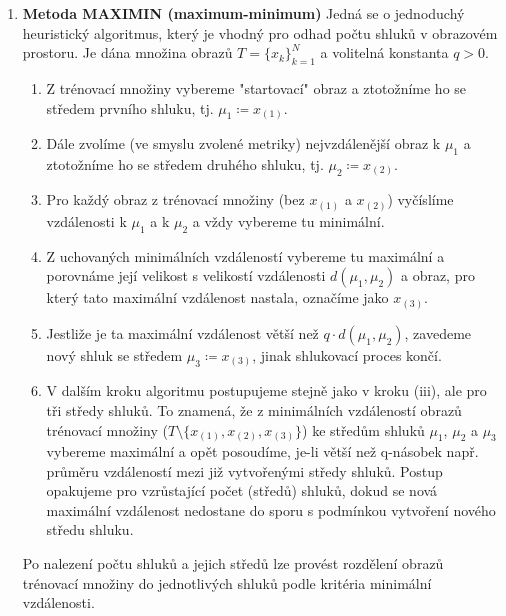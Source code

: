 \begin{enumerate}[label=(\Alph*)]
\begin{enumerate}[label=\arabic*.]
\item \textbf{Metoda MAXIMIN (maximum-minimum)}
Jedná se o jednoduchý heuristický algoritmus, který je vhodný pro odhad počtu shluků v obrazovém prostoru. Je dána množina obrazů $ T = \{x_k\}_{k=1}^N $ a volitelná konstanta $ q > 0 $.
\begin{enumerate}[label=(\roman*)]
\item Z trénovací množiny vybereme "startovací" obraz a ztotožníme ho se středem prvního shluku, tj. $ \mu_1 \coloneqq x_{(1)} $.
\item Dále zvolíme (ve smyslu zvolené metriky) nejvzdálenější obraz k $ \mu_1 $ a ztotožníme ho se středem druhého shluku, tj. $ \mu_2 \coloneqq x_{(2)} $.
\item Pro každý obraz z trénovací množiny (bez $ x_{(1)} $ a $ x_{(2)} $) vyčíslíme vzdálenosti k $ \mu_1 $ a k $ \mu_2 $ a vždy vybereme tu minimální.
\item Z uchovaných minimálních vzdáleností vybereme tu maximální a porovnáme její velikost s velikostí vzdálenosti $ d(\mu_1, \mu_2) $ a obraz, pro který tato maximální vzdálenost nastala, označíme jako $ x_{(3)} $.
\item Jestliže je ta maximální vzdálenost větší než $ q \cdot d(\mu_1, \mu_2) $, zavedeme nový shluk se středem $ \mu_3 \coloneqq x_{(3)} $, jinak shlukovací proces končí.
\item V dalším kroku algoritmu postupujeme stejně jako v kroku (iii), ale pro tři středy shluků. To znamená, že z minimálních vzdáleností obrazů trénovací množiny ($ T \setminus \{x_{(1)}, x_{(2)}, x_{(3)} \} $) ke středům shluků $ \mu_1 $, $ \mu_2 $ a $ \mu_3 $ vybereme maximální a opět posoudíme, je-li větší než q-násobek např. průměru vzdáleností mezi již vytvořenými středy shluků. Postup opakujeme pro vzrůstající počet (středů) shluků, dokud se nová maximální vzdálenost nedostane do sporu s podmínkou vytvoření nového středu shluku.
\end{enumerate}
Po nalezení počtu shluků a jejich středů lze provést rozdělení obrazů trénovací množiny do jednotlivých shluků podle kritéria minimální vzdálenosti.


\end{enumerate}
\end{enumerate}

